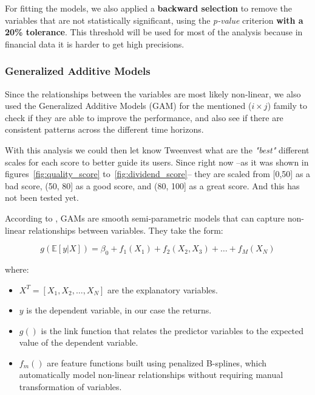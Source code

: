 \documentclass[11pt,english,a4paper,hidelinks]{book}
\begin{document}
\noindent For fitting the models, we also applied a \textbf{backward selection} to remove the variables that are not statistically significant, using the \textit{p-value} criterion \textbf{with a 20\% tolerance}. This threshold will be used for most of the analysis because in financial data it is harder to get high precisions.

\subsubsection{Generalized Additive Models}

Since the relationships between the variables are most likely non-linear, we also used the Generalized Additive Models (GAM) for the mentioned (\(i \times j\)) family to check if they are able to improve the performance, and also see if there are consistent patterns across the different time horizons.

\vspace{0.5cm}
\noindent With this analysis we could then let know Tweenvest what are the \textit{"best"} different scales for each score to better guide its users. Since right now --as it was shown in figures~\ref{fig:quality_score} to~\ref{fig:dividend_score}-- they are scaled from [0,50] as a bad score, (50, 80] as a good score, and (80, 100] as a great score. And this has not been tested yet.

\vspace{0.5cm}
\noindent According to \textcite{pygam2018}, GAMs are smooth semi-parametric models that can capture non-linear relationships between variables. They take the form:

\begin{equation}
    g(\mathbb{E}[y|X]) = \beta_0 + f_1(X_1) + f_2(X_2,X_3) + \dots + f_M(X_N)
\end{equation}

\noindent where:
\begin{itemize}
    \item \(X^T = [X_1, X_2, \dots, X_N]\) are the explanatory variables.
    \item \(y\) is the dependent variable, in our case the returns.
    \item \(g()\) is the link function that relates the predictor variables to the expected value of the dependent variable.
    \item \(f_m()\) are feature functions built using penalized B-splines, which automatically model non-linear relationships without requiring manual transformation of variables.
\end{itemize}
\end{document}
